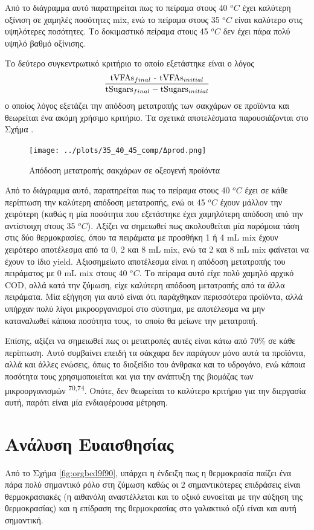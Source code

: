 \documentclass[11pt]{report}
\makeatletter
\newcommand{\citeprocitem}[2]{\hyper@linkstart{cite}{citeproc_bib_item_#1}#2\hyper@linkend}
\makeatother
\begin{document}
Από το διάγραμμα αυτό παρατηρείται πως το πείραμα στους 40 \(^oC\) έχει καλύτερη οξίνιση σε χαμηλές ποσότητες \acrshort{mix}, ενώ το πείραμα στους 35 \(^oC\) είναι καλύτερο στις υψηλότερες ποσότητες. Το δοκιμαστικό πείραμα στους 45 \(^oC\) δεν έχει πάρα πολύ υψηλό βαθμό οξίνισης.

Το δεύτερο συγκεντρωτικό κριτήριο το οποίο εξετάστηκε είναι ο λόγος \[ \frac{\text{tVFAs$_{final}$ - \text{tVFAs$_{initial}$}}}{\text{tSugars$_{final}$} -  \text{tSugars$_{initial}$}} \] ο οποίος λόγος εξετάζει την απόδοση μετατροπής των σακχάρων σε προϊόντα και θεωρείται ένα ακόμη χρήσιμο κριτήριο. Τα σχετικά αποτελέσματα παρουσιάζονται στο Σχήμα .

\begin{figure}[htbp]
\centering
\texttt{[image: ../plots/35\_40\_45\_comp/Δprod.png]}
\caption{Απόδοση μετατροπής σακχάρων σε οξεογενή προϊόντα}
\end{figure}

Από το διάγραμμα αυτό, παρατηρείται πως το πείραμα στους 40 \(^oC\) έχει σε κάθε περίπτωση την καλύτερη απόδοση μετατροπής, ενώ οι 45 \(^oC\) έχουν μάλλον την χειρότερη (καθώς η μία ποσότητα που εξετάστηκε έχει χαμηλότερη απόδοση από την αντίστοιχη στους 35 \(^oC\)). Αξίζει να σημειωθεί πως ακολουθείται μία παρόμοια τάση στις δύο θερμοκρασίες, όπου τα πειράματα με προσθήκη 1 ή 4 mL \acrshort{mix} έχουν χειρότερο αποτέλεσμα από τα 0, 2 και 8 mL \acrshort{mix}, ενώ τα 2 και 8 mL \acrshort{mix} φαίνεται να έχουν το ίδιο yield. Αξιοσημείωτο αποτέλεσμα είναι η απόδοση μετατροπής του πειράματος με 0 mL \acrshort{mix} στους 40 \(^oC\). Το πείραμα αυτό είχε πολύ χαμηλό αρχικό COD, αλλά κατά την ζύμωση, είχε καλύτερη απόδοση μετατροπής από τα άλλα πειράματα. Μία εξήγηση για αυτό είναι ότι παράχθηκαν περισσότερα προϊόντα, αλλά υπήρχαν πολύ λίγοι μικροοργανισμοί στο σύστημα, με αποτέλεσμα να μην καταναλωθεί κάποια ποσότητα τους, το οποίο θα μείωνε την μετατροπή.

Επίσης, αξίζει να σημειωθεί πως οι μετατροπές αυτές είναι κάτω από \(70 \%\) σε κάθε περίπτωση. Αυτό συμβαίνει επειδή τα σάκχαρα δεν παράγουν μόνο αυτά τα προϊόντα, αλλά και άλλες ενώσεις, όπως το διοξείδιο του άνθρακα και το υδρογόνο, ενώ κάποια ποσότητα τους χρησιμοποιείται και για την ανάπτυξη της βιομάζας των μικροοργανισμών \textsuperscript{\citeprocitem{70}{70},\citeprocitem{74}{74}}. Οπότε, δεν θεωρείται το καλύτερο κριτήριο για την διεργασία αυτή, παρότι είναι μία ενδιαφέρουσα μέτρηση.

\section{Ανάλυση Ευαισθησίας}
\label{sec:org76bd322}
Από το Σχήμα \ref{fig:orgbcd9f90}, υπάρχει η ένδειξη πως η θερμοκρασία παίζει ένα πάρα πολύ σημαντικό ρόλο στη ζύμωση καθώς οι 2 σημαντικότερες επιδράσεις είναι θερμοκρασιακές (η αιθανόλη αναστέλλεται και το οξικό ευνοείται με την αύξηση της θερμοκρασίας) και η επίδραση της θερμοκρασίας στο γαλακτικό οξύ είναι και αυτή σημαντική.
\end{document}
